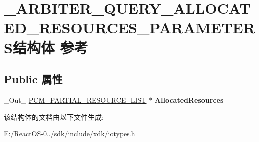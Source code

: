 \hypertarget{struct___a_r_b_i_t_e_r___q_u_e_r_y___a_l_l_o_c_a_t_e_d___r_e_s_o_u_r_c_e_s___p_a_r_a_m_e_t_e_r_s}{}\section{\+\_\+\+A\+R\+B\+I\+T\+E\+R\+\_\+\+Q\+U\+E\+R\+Y\+\_\+\+A\+L\+L\+O\+C\+A\+T\+E\+D\+\_\+\+R\+E\+S\+O\+U\+R\+C\+E\+S\+\_\+\+P\+A\+R\+A\+M\+E\+T\+E\+R\+S结构体 参考}
\label{struct___a_r_b_i_t_e_r___q_u_e_r_y___a_l_l_o_c_a_t_e_d___r_e_s_o_u_r_c_e_s___p_a_r_a_m_e_t_e_r_s}
\subsection*{Public 属性}
\begin{DoxyCompactItemize}
\item 
\mbox{\label{struct___a_r_b_i_t_e_r___q_u_e_r_y___a_l_l_o_c_a_t_e_d___r_e_s_o_u_r_c_e_s___p_a_r_a_m_e_t_e_r_s_a12abe41c0d367bbc1c0cddb3357a36b3}} 
\+\_\+\+Out\+\_\+ \hyperlink{struct___c_m___p_a_r_t_i_a_l___r_e_s_o_u_r_c_e___l_i_s_t}{P\+C\+M\+\_\+\+P\+A\+R\+T\+I\+A\+L\+\_\+\+R\+E\+S\+O\+U\+R\+C\+E\+\_\+\+L\+I\+ST} $\ast$ {\bfseries Allocated\+Resources}
\end{DoxyCompactItemize}


该结构体的文档由以下文件生成\+:\begin{DoxyCompactItemize}
\item 
E\+:/\+React\+O\+S-\/0../sdk/include/xdk/iotypes.\+h\end{DoxyCompactItemize}

